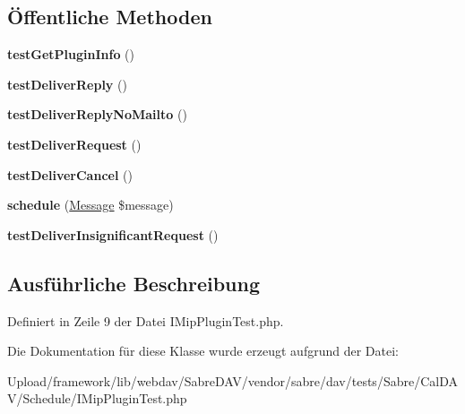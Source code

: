 \subsection*{Öffentliche Methoden}
\begin{DoxyCompactItemize}
\item 
\mbox{\label{class_sabre_1_1_cal_d_a_v_1_1_schedule_1_1_i_mip_plugin_test_ae4e9f2026bd5dc1197b7d38c429f5c39}} 
{\bfseries test\+Get\+Plugin\+Info} ()
\item 
\mbox{\label{class_sabre_1_1_cal_d_a_v_1_1_schedule_1_1_i_mip_plugin_test_a6c97ab7d18b79d32328cba963e40491e}} 
{\bfseries test\+Deliver\+Reply} ()
\item 
\mbox{\label{class_sabre_1_1_cal_d_a_v_1_1_schedule_1_1_i_mip_plugin_test_ae4868a7a029f830d0e05733229811388}} 
{\bfseries test\+Deliver\+Reply\+No\+Mailto} ()
\item 
\mbox{\label{class_sabre_1_1_cal_d_a_v_1_1_schedule_1_1_i_mip_plugin_test_aecfb6e5813c35daede98641df450eb58}} 
{\bfseries test\+Deliver\+Request} ()
\item 
\mbox{\label{class_sabre_1_1_cal_d_a_v_1_1_schedule_1_1_i_mip_plugin_test_ab03288cd75486665dfe448479ee2438b}} 
{\bfseries test\+Deliver\+Cancel} ()
\item 
\mbox{\label{class_sabre_1_1_cal_d_a_v_1_1_schedule_1_1_i_mip_plugin_test_a740553bb717dcaf5ef341e535a6d08e7}} 
{\bfseries schedule} (\mbox{\hyperlink{class_sabre_1_1_h_t_t_p_1_1_message}{Message}} \$message)
\item 
\mbox{\label{class_sabre_1_1_cal_d_a_v_1_1_schedule_1_1_i_mip_plugin_test_abb85b788b6e155d43d9a9518036ba83f}} 
{\bfseries test\+Deliver\+Insignificant\+Request} ()
\end{DoxyCompactItemize}


\subsection{Ausführliche Beschreibung}


Definiert in Zeile 9 der Datei I\+Mip\+Plugin\+Test.\+php.



Die Dokumentation für diese Klasse wurde erzeugt aufgrund der Datei\+:\begin{DoxyCompactItemize}
\item 
Upload/framework/lib/webdav/\+Sabre\+D\+A\+V/vendor/sabre/dav/tests/\+Sabre/\+Cal\+D\+A\+V/\+Schedule/I\+Mip\+Plugin\+Test.\+php\end{DoxyCompactItemize}
